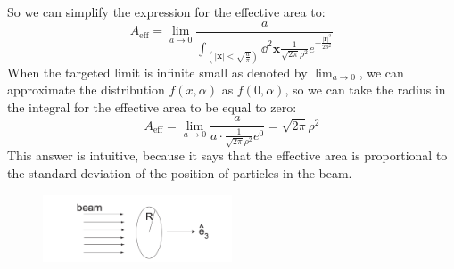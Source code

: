 \documentclass[12pt]{article}
\begin{document}
So we can simplify the expression for the effective area to:
\begin{equation}
A_{\text{eff}} = \lim_{a \to 0} \frac{a}{\int_{(|\textbf{x}| < \sqrt{\frac{a}{\pi}})} \dd^2{\textbf{x}} \frac{1}{{\sqrt{2\pi }\rho^2}} e^{-\frac{|\textbf{r}|^2}{2\rho^2}}}
\end{equation}
 When the targeted limit is infinite small as denoted by $\lim_{a \to 0}$, we can approximate the distribution $f(x, \alpha )$ as $f(0, \alpha )$, so we can take the radius in the integral for the effective area to be equal to zero:
\begin{equation}
A_{\text{eff}} = \lim_{a \to 0} \frac{a}{a\cdot\frac{1}{\sqrt{2\pi }\rho^2}e^0} = \sqrt{2\pi }\rho^2
\end{equation}
This answer is intuitive, because it says that the effective area is proportional to the standard deviation of the position of particles in the beam.
 
\begin{figure}
\centering
\includegraphics[width=0.5\textwidth]{gaussian.png}
\end{figure}
\end{document}
